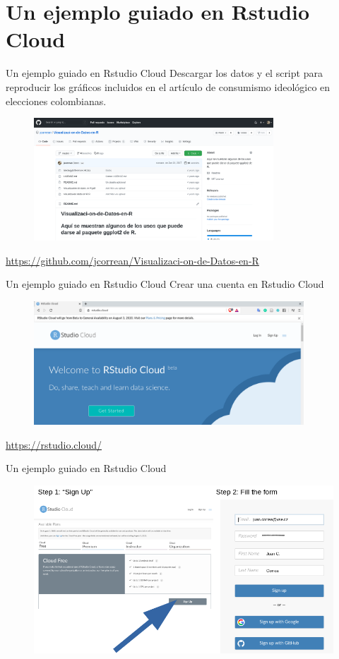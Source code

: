 \documentclass{beamer}
\begin{document}
\section{Un ejemplo guiado en Rstudio Cloud}
\begin{frame}{Un ejemplo guiado en Rstudio Cloud}
Descargar los datos y el script para reproducir los gráficos incluidos en el artículo de consumismo ideológico en elecciones colombianas.
\begin{figure}
\centering
\includegraphics[width=0.8\textwidth]{GitHub.png}
\end{figure}
\textcolor{blue}{\url{https://github.com/jcorrean/Visualizaci-on-de-Datos-en-R}}
\end{frame}

\begin{frame}{Un ejemplo guiado en Rstudio Cloud}
Crear una cuenta en Rstudio Cloud
\begin{figure}
\centering
\includegraphics[width=0.9\textwidth]{RstudioCloud.png}
\end{figure}
\textcolor{blue}{\url{https://rstudio.cloud/}}
\end{frame}

\begin{frame}{Un ejemplo guiado en Rstudio Cloud}
\begin{figure}
\centering
\includegraphics[width=1\textwidth]{RstudioAccount.png}
\end{figure}  
\end{frame}
\end{document}
